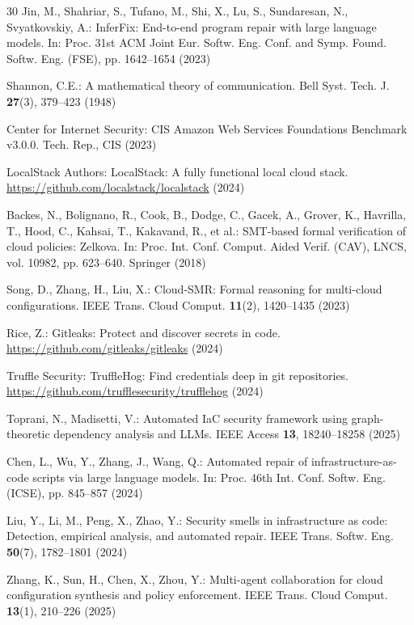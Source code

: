 \documentclass[runningheads]{llncs}
\begin{document}
\begin{thebibliography}{30}
Jin, M., Shahriar, S., Tufano, M., Shi, X., Lu, S., Sundaresan, N., Svyatkovskiy, A.: InferFix: End-to-end program repair with large language models. In: Proc. 31st ACM Joint Eur. Softw. Eng. Conf. and Symp. Found. Softw. Eng. (FSE), pp. 1642--1654 (2023)

Shannon, C.E.: A mathematical theory of communication. Bell Syst. Tech. J. \textbf{27}(3), 379--423 (1948)

Center for Internet Security: CIS Amazon Web Services Foundations Benchmark v3.0.0. Tech. Rep., CIS (2023)

LocalStack Authors: LocalStack: A fully functional local cloud stack. \url{https://github.com/localstack/localstack} (2024)

Backes, N., Bolignano, R., Cook, B., Dodge, C., Gacek, A., Grover, K., Havrilla, T., Hood, C., Kahsai, T., Kakavand, R., et al.: SMT-based formal verification of cloud policies: Zelkova. In: Proc. Int. Conf. Comput. Aided Verif. (CAV), LNCS, vol. 10982, pp. 623--640. Springer (2018)

Song, D., Zhang, H., Liu, X.: Cloud-SMR: Formal reasoning for multi-cloud configurations. IEEE Trans. Cloud Comput. \textbf{11}(2), 1420--1435 (2023)

Rice, Z.: Gitleaks: Protect and discover secrets in code. \url{https://github.com/gitleaks/gitleaks} (2024)

Truffle Security: TruffleHog: Find credentials deep in git repositories. \url{https://github.com/trufflesecurity/trufflehog} (2024)

Toprani, N., Madisetti, V.: Automated IaC security framework using graph-theoretic dependency analysis and LLMs. IEEE Access \textbf{13}, 18240--18258 (2025)

Chen, L., Wu, Y., Zhang, J., Wang, Q.: Automated repair of infrastructure-as-code scripts via large language models. In: Proc. 46th Int. Conf. Softw. Eng. (ICSE), pp. 845--857 (2024)

Liu, Y., Li, M., Peng, X., Zhao, Y.: Security smells in infrastructure as code: Detection, empirical analysis, and automated repair. IEEE Trans. Softw. Eng. \textbf{50}(7), 1782--1801 (2024)

Zhang, K., Sun, H., Chen, X., Zhou, Y.: Multi-agent collaboration for cloud configuration synthesis and policy enforcement. IEEE Trans. Cloud Comput. \textbf{13}(1), 210--226 (2025)


\end{thebibliography}
\end{document}
